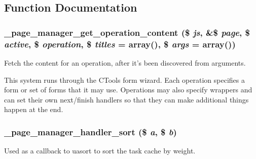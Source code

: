\subsection{Function Documentation}
\hypertarget{page__manager_8admin_8inc_aa379143ef5ed68cc40f2a6dac3c5d456}{
\subsubsection[{\_\-page\_\-manager\_\-get\_\-operation\_\-content}]{\setlength{\rightskip}{0pt plus 5cm}\_\-page\_\-manager\_\-get\_\-operation\_\-content (\$ {\em js}, \/  \&\$ {\em page}, \/  \$ {\em active}, \/  \$ {\em operation}, \/  \$ {\em titles} = {\ttfamily array()}, \/  \$ {\em args} = {\ttfamily array()})}}
\label{page__manager_8admin_8inc_aa379143ef5ed68cc40f2a6dac3c5d456}
Fetch the content for an operation, after it's been discovered from arguments.

This system runs through the CTools form wizard. Each operation specifies a form or set of forms that it may use. Operations may also specify wrappers and can set their own next/finish handlers so that they can make additional things happen at the end. \hypertarget{page__manager_8admin_8inc_a5eacb554e7d98265ede82a0ae0c3a628}{
\subsubsection[{\_\-page\_\-manager\_\-handler\_\-sort}]{\setlength{\rightskip}{0pt plus 5cm}\_\-page\_\-manager\_\-handler\_\-sort (\$ {\em a}, \/  \$ {\em b})}}
\label{page__manager_8admin_8inc_a5eacb554e7d98265ede82a0ae0c3a628}
Used as a callback to uasort to sort the task cache by weight.

